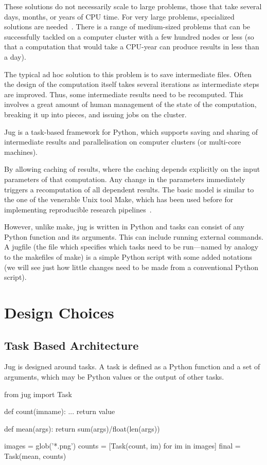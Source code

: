\documentclass{article}
\begin{document}
These solutions do not necessarily scale to large problems, those that take
several days, months, or years of CPU time. For very large problems,
specialized solutions are needed~\citep{mapReduce}. There is a range of
medium-sized problems that can be successfully tackled on a computer cluster
with a few hundred nodes or less (so that a computation that would take a
CPU-year can produce results in less than a day).

The typical ad hoc solution to this problem is to save intermediate files.
Often the design of the computation itself takes several iterations as
intermediate steps are improved. Thus, some intermediate results need to be
recomputed. This involves a great amount of human management of the state of
the computation, breaking it up into pieces, and issuing jobs on the cluster.

Jug is a task-based framework for Python, which supports saving and sharing of
intermediate results and parallelisation on computer clusters (or multi-core
machines).

By allowing caching of results, where the caching depends explicitly on the
input parameters of that computation. Any change in the parameters immediately
triggers a recomputation of all dependent results. The basic model is similar
to the one of the venerable Unix tool Make, which has been used before for
implementing reproducible research pipelines~\citep{Schwab00makingscientific}.

However, unlike make, jug is written in Python and tasks can consist of any
Python function and its arguments. This can include running external commands.
A jugfile (the file which specifies which tasks need to be run---named by
analogy to the makefiles of make) is a simple Python script with some added
notations (we will see just how little changes need to be made from a
conventional Python script).

\section{Design Choices}
\subsection{Task Based Architecture}

Jug is designed around tasks. A task is defined as a Python function and a set
of arguments, which may be Python values or the output of other tasks.

\begin{python}
from jug import Task

def count(imname):
    ...
    return value

def mean(args):
    return sum(args)/float(len(args))

images = glob('*.png')
counts = [Task(count, im) for im in images]
final = Task(mean, counts)
\end{python}
\end{document}

